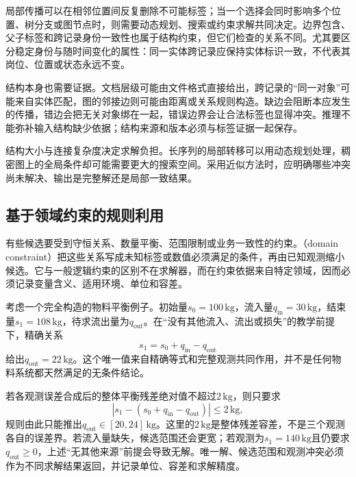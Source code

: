局部传播可以在相邻位置间反复删除不可能标签；当一个选择会同时影响多个位置、树分支或图节点时，则需要动态规划、搜索或约束求解共同决定。边界包含、父子标签和跨记录身份一致性也属于结构约束，但它们检查的关系不同。尤其要区分稳定身份与随时间变化的属性：同一实体跨记录应保持实体标识一致，不代表其岗位、位置或状态永远不变。

结构本身也需要证据。文档层级可能由文件格式直接给出，跨记录的“同一对象”可能来自实体匹配，图的邻接边则可能由距离或关系规则构造。缺边会阻断本应发生的传播，错边会把无关对象绑在一起，错误边界会让合法标签也显得冲突。推理不能弥补输入结构缺少依据；结构来源和版本必须与标签证据一起保存。

结构大小与连接复杂度决定求解负担。长序列的局部转移可以用动态规划处理，稠密图上的全局条件却可能需要更大的搜索空间。采用近似方法时，应明确哪些冲突尚未解决、输出是完整解还是局部一致结果。

\subsection{基于领域约束的规则利用}
\label{sec:rule-based-knowledge-acquisition-domain-constraint}

有些候选要受到守恒关系、数量平衡、范围限制或业务一致性的约束。（domain constraint）把这些关系写成未知标签或数值必须满足的条件，再由已知观测缩小候选。它与一般逻辑约束的区别不在求解器，而在约束依据来自特定领域，因而必须记录变量含义、适用环境、单位和容差。

考虑一个完全构造的物料平衡例子。初始量$s_0=100\,\mathrm{kg}$，流入量$q_{\mathrm{in}}=30\,\mathrm{kg}$，结束量$s_1=108\,\mathrm{kg}$，待求流出量为$q_{\mathrm{out}}$。在“没有其他流入、流出或损失”的教学前提下，精确关系
\begin{equation}
  s_1=s_0+q_{\mathrm{in}}-q_{\mathrm{out}}
  \label{eq:rule-based-knowledge-acquisition-balance}
\end{equation}
给出$q_{\mathrm{out}}=22\,\mathrm{kg}$。这个唯一值来自精确等式和完整观测共同作用，并不是任何物料系统都天然满足的无条件结论。

若各观测误差合成后的整体平衡残差绝对值不超过$2\,\mathrm{kg}$，则只要求
\[
  \left|s_1-(s_0+q_{\mathrm{in}}-q_{\mathrm{out}})\right|
  \leq 2\,\mathrm{kg},
\]
规则由此只能推出$q_{\mathrm{out}}\in[20,24]\,\mathrm{kg}$。这里的$2\,\mathrm{kg}$是整体残差容差，不是三个观测各自的误差界。若流入量缺失，候选范围还会更宽；若观测为$s_1=140\,\mathrm{kg}$且仍要求$q_{\mathrm{out}}\geq0$，上述“无其他来源”前提会导致无解。唯一解、候选范围和观测冲突必须作为不同求解结果返回，并记录单位、容差和求解精度。

